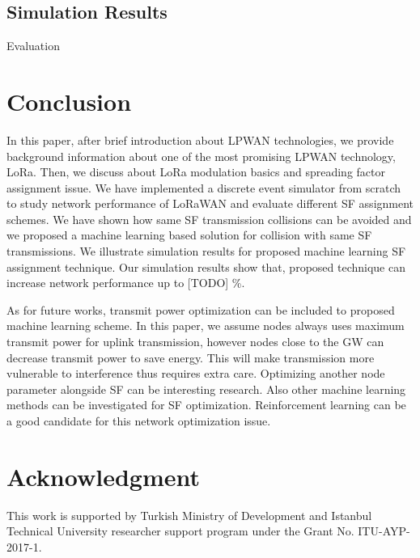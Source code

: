 \documentclass[conference]{IEEEtran}
\begin{document}
\subsection{Simulation Results}
\par [TODO] Evaluation


\section{Conclusion} \label{Conclusion}
\par In this paper, after brief introduction about LPWAN technologies, we provide background information about one of the most promising LPWAN technology, LoRa. Then, we discuss about LoRa modulation basics and spreading factor assignment issue. We have implemented a discrete event simulator from scratch to study network performance of LoRaWAN and evaluate different SF assignment schemes. We have shown how same SF transmission collisions can be avoided and we proposed a machine learning based solution for collision with same SF transmissions. We illustrate simulation results for proposed machine learning SF assignment technique. Our simulation results show that, proposed technique can increase network performance up to [TODO] \%.

\par As for future works, transmit power optimization can be included to proposed machine learning scheme. In this paper, we assume nodes always uses maximum transmit power for uplink transmission, however nodes close to the GW can decrease transmit power to save energy. This will make transmission more vulnerable to interference thus requires extra care. Optimizing another node parameter alongside SF can be interesting research. Also other machine learning methods can be investigated for SF optimization. 
Reinforcement learning can be a good candidate for this network optimization issue.

\par \cite{7815384} \cite{7803607} \cite{7996384} \cite{8090518} \cite{s17061193} \cite{8267219} \cite{8430542} \cite{8319183} \cite{8480649} \cite{AN1200.22} \cite{Bor:2016:LLW:2988287.2989163} \cite{8406255} \cite{DBLP:journals/corr/abs-1802-10338} \cite{finnegan2018comparative}


\section*{Acknowledgment}
\par This work is supported by Turkish Ministry of Development and Istanbul Technical University researcher support program under the Grant No. ITU-AYP-2017-1.




\end{document}

